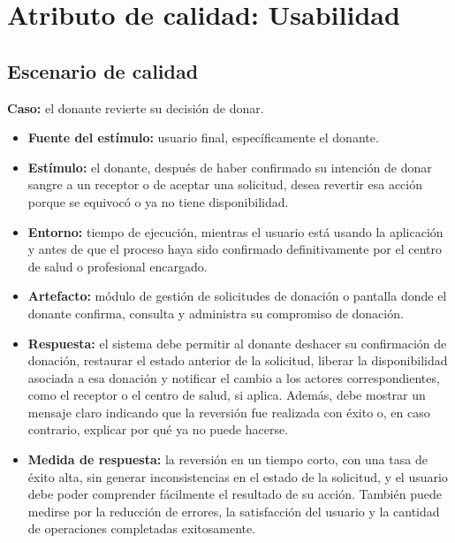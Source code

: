 \section{Atributo de calidad: Usabilidad}

\subsection{Escenario de calidad}

\textbf{Caso:} el donante revierte su decisión de donar.

\begin{itemize}
    \item \textbf{Fuente del estímulo:} usuario final, específicamente el donante.
    \item \textbf{Estímulo:} el donante, después de haber confirmado su intención de donar sangre a un receptor o de aceptar una solicitud, desea revertir esa acción porque se equivocó o ya no tiene disponibilidad.
    \item \textbf{Entorno:} tiempo de ejecución, mientras el usuario está usando la aplicación y antes de que el proceso haya sido confirmado definitivamente por el centro de salud o profesional encargado.
    \item \textbf{Artefacto:} módulo de gestión de solicitudes de donación o pantalla donde el donante confirma, consulta y administra su compromiso de donación.
    \item \textbf{Respuesta:} el sistema debe permitir al donante deshacer su confirmación de donación, restaurar el estado anterior de la solicitud, liberar la disponibilidad asociada a esa donación y notificar el cambio a los actores correspondientes, como el receptor o el centro de salud, si aplica. Además, debe mostrar un mensaje claro indicando que la reversión fue realizada con éxito o, en caso contrario, explicar por qué ya no puede hacerse.
    \item \textbf{Medida de respuesta:} la reversión en un tiempo corto, con una tasa de éxito alta, sin generar inconsistencias en el estado de la solicitud, y el usuario debe poder comprender fácilmente el resultado de su acción. También puede medirse por la reducción de errores, la satisfacción del usuario y la cantidad de operaciones completadas exitosamente.
\end{itemize}

